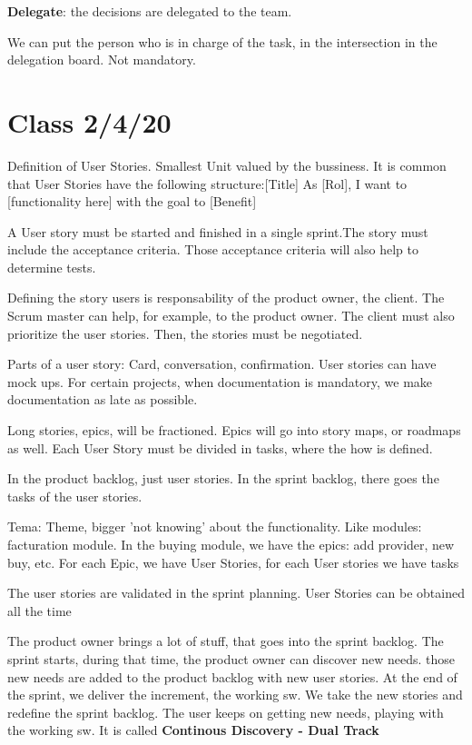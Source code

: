 \documentclass[a4paper,12pt]{article}
\begin{document}
\textbf{Delegate}: the decisions are delegated to the team.

We can put the person who is in charge of the task, in the intersection in the delegation board. Not mandatory.

\section{Class 2/4/20}

Definition of User Stories.
Smallest Unit valued by the bussiness.
It is common that User Stories have the following structure:[Title] As [Rol], I want to [functionality here] with the goal to [Benefit]

A User story must be started and finished in a single sprint.The story must include the acceptance criteria. Those acceptance criteria will also help to determine tests.

Defining the story users is responsability of the product owner, the client. The Scrum master can help, for example, to the product owner. The client must also prioritize the user stories. Then, the stories must be negotiated.

Parts of a user story: Card, conversation, confirmation. User stories can have mock ups. For certain projects, when documentation is mandatory, we make documentation as late as possible. 

Long stories, epics, will be fractioned. Epics will go into story maps, or roadmaps as well. Each User Story must be divided in tasks, where the how is defined.

In the product backlog, just user stories. In the sprint backlog, there goes the tasks of the user stories.

Tema: Theme, bigger 'not knowing' about the functionality. Like modules: facturation module. In the buying module, we have the epics: add provider, new buy, etc. For each Epic, we have User Stories, for each User stories we have tasks

The user stories are validated in the sprint planning. User Stories can be obtained all the time

The product owner brings a lot of stuff, that goes into the sprint backlog. The sprint starts, during that time, the product owner can discover new needs. those new needs are added to the product backlog with new user stories. At the end of the sprint, we deliver the increment, the working sw. We take the new stories and redefine the sprint backlog. The user keeps on getting new needs, playing with the working sw. It is called \textbf{Continous Discovery - Dual Track}
\end{document}
